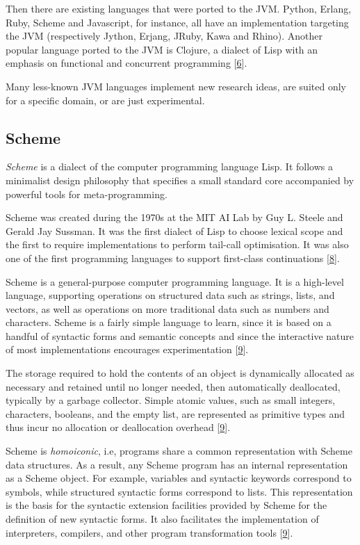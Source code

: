 \documentclass[12pt,a4paper,oneside,openright]{book}
\begin{document}
Then there are existing languages that were ported to the JVM. Python,
Erlang, Ruby, Scheme and Javascript, for instance, all have an
implementation targeting the JVM (respectively Jython, Erjang, JRuby,
Kawa and Rhino). Another popular language ported to the JVM is Clojure,
a dialect of Lisp with an emphasis on functional and concurrent
programming {[}\hyperref[ref-JVMWiki2015]{6}{]}.

Many less-known JVM languages implement new research ideas, are suited
only for a specific domain, or are just experimental.

\subsection{Scheme}\label{scheme}

\emph{Scheme} is a dialect of the computer programming language Lisp. It
follows a minimalist design philosophy that specifies a small standard
core accompanied by powerful tools for meta-programming.

Scheme was created during the 1970s at the MIT AI Lab by Guy L. Steele
and Gerald Jay Sussman. It was the first dialect of Lisp to choose
lexical scope and the first to require implementations to perform
tail-call optimisation. It was also one of the first programming
languages to support first-class continuations
{[}\hyperref[ref-SchemeWiki2015]{8}{]}.

Scheme is a general-purpose computer programming language. It is a
high-level language, supporting operations on structured data such as
strings, lists, and vectors, as well as operations on more traditional
data such as numbers and characters. Scheme is a fairly simple language
to learn, since it is based on a handful of syntactic forms and semantic
concepts and since the interactive nature of most implementations
encourages experimentation {[}\hyperref[ref-dybvig2009scheme]{9}{]}.

The storage required to hold the contents of an object is dynamically
allocated as necessary and retained until no longer needed, then
automatically deallocated, typically by a garbage collector. Simple
atomic values, such as small integers, characters, booleans, and the
empty list, are represented as primitive types and thus incur no
allocation or deallocation overhead
{[}\hyperref[ref-dybvig2009scheme]{9}{]}.

Scheme is \emph{homoiconic}, i.e, programs share a common representation
with Scheme data structures. As a result, any Scheme program has an
internal representation as a Scheme object. For example, variables and
syntactic keywords correspond to symbols, while structured syntactic
forms correspond to lists. This representation is the basis for the
syntactic extension facilities provided by Scheme for the definition of
new syntactic forms. It also facilitates the implementation of
interpreters, compilers, and other program transformation tools
{[}\hyperref[ref-dybvig2009scheme]{9}{]}.
\end{document}
